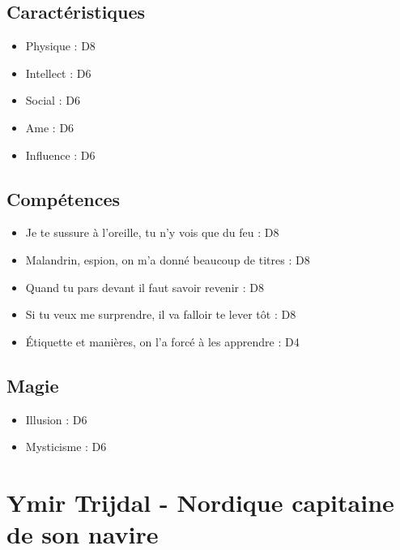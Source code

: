 \documentclass{Tamriel}
\begin{document}
\begin{multicols*}{2}
        \section*{Caractéristiques}

        \begin{itemize}
        \item Physique : D8
        \item Intellect : D6
        \item Social : D6
        \item Ame : D6
        \item Influence : D6
        \end{itemize}

        \section*{Compétences}

        \begin{itemize}
        \item Je te sussure à l'oreille, tu n'y vois que du feu : D8
        \item Malandrin, espion, on m'a donné beaucoup de titres : D8
        \item Quand tu pars devant il faut savoir revenir : D8
        \item Si tu veux me surprendre, il va falloir te lever tôt : D8
        \item Étiquette et manières, on l'a forcé à les apprendre : D4
        \end{itemize}
        
        \section*{Magie}

        \begin{itemize}
        \item Illusion : D6
        \item Mysticisme : D6
        \end{itemize}

\end{multicols*}

\chapter*{Ymir Trijdal - Nordique capitaine de son navire}
\end{document}
